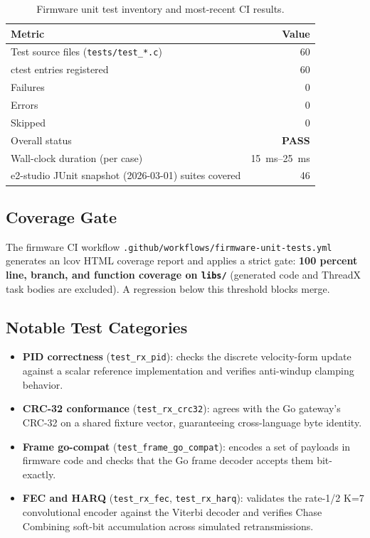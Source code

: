 \documentclass[11pt,letterpaper]{article}
\newcommand{\pass}{{\color{passgreen}\textbf{PASS}}}
\begin{document}
\begin{table}[H]
\centering
\caption{Firmware unit test inventory and most-recent CI results.}
\label{tab:fw-results}
\small
\begin{tabular}{l r}
\toprule
\textbf{Metric} & \textbf{Value} \\
\midrule
Test source files (\texttt{tests/test\_*.c})          & 60 \\
ctest entries registered                              & 60 \\
Failures                                              & 0 \\
Errors                                                & 0 \\
Skipped                                               & 0 \\
Overall status                                        & \pass{} \\
Wall-clock duration (per case)                        & \qtyrange{15}{25}{\milli\second} \\
e2-studio JUnit snapshot (2026-03-01) suites covered  & 46 \\
\bottomrule
\end{tabular}
\end{table}

\subsection{Coverage Gate}
The firmware CI workflow \texttt{.github/workflows/firmware-unit-tests.yml}
generates an lcov HTML coverage report and applies a strict gate: \textbf{100
percent line, branch, and function coverage on
\texttt{libs/}} (generated code and ThreadX task bodies are excluded).
A regression below this threshold blocks merge.

\subsection{Notable Test Categories}
\begin{itemize}[leftmargin=1.4em,itemsep=2pt]
\item \textbf{PID correctness} (\texttt{test\_rx\_pid}): checks the
      discrete velocity-form update against a scalar reference
      implementation and verifies anti-windup clamping behavior.
\item \textbf{CRC-32 conformance} (\texttt{test\_rx\_crc32}): agrees
      with the Go gateway's CRC-32 on a shared fixture vector,
      guaranteeing cross-language byte identity.
\item \textbf{Frame go-compat} (\texttt{test\_frame\_go\_compat}):
      encodes a set of payloads in firmware code and checks that
      the Go frame decoder accepts them bit-exactly.
\item \textbf{FEC and HARQ} (\texttt{test\_rx\_fec},
      \texttt{test\_rx\_harq}): validates the rate-1/2 K=7
      convolutional encoder against the Viterbi decoder and
      verifies Chase Combining soft-bit accumulation across
      simulated retransmissions.
\end{itemize}
\end{document}
